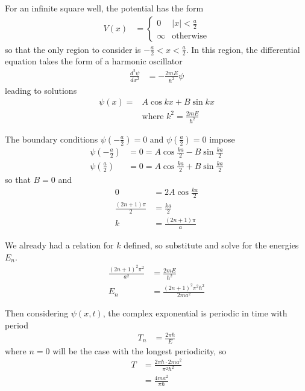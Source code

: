 For an infinite square well, the potential has the form
\begin{align*}
	V(x) &=
		\begin{cases}
			0	&	|x| < \frac{a}{2} \\
			\infty 	&	\text{otherwise}
		\end{cases}
\end{align*}
so that the only region to consider is $-\frac{a}{2} < x < \frac{a}{2}$. In this
region, the differential equation takes the form of a harmonic oscillator
\begin{align*}
	\frac{d^2\psi }{dx^2} &= -\frac{2mE}{{\hbar}^2}\psi 
\end{align*}
leading to solutions
\begin{align*}
	\psi (x) ={}& A\cos kx + B\sin kx \\
	{}& \text{where } k^2 = \frac{2mE}{{\hbar}^2}
\end{align*}

The boundary conditions $\psi (-\frac{a}{2}) = 0$ and $\psi (\frac{a}{2}) = 0$ impose
\begin{align*}
	\psi \left(-\frac{a}{2}\right) &= 0 = A\cos \frac{ka}{2} - B\sin \frac{ka}{2} \\
	\psi \left(\frac{a}{2}\right)  &= 0 = A\cos \frac{ka}{2} + B\sin \frac{ka}{2}
\end{align*}
so that $B = 0$ and
\begin{align*}
	0 &= 2A \cos \frac{ka}{2} \\
	\frac{(2n+1){\pi}}{2} &= \frac{ka}{2} \\
	k &= \frac{(2n+1){\pi}}{a}
\end{align*}

We already had a relation for $k$ defined, so substitute and solve for the
energies $E_n$.
\begin{align*}
	\frac{(2n+1)^2{\pi}^2}{a^2} &= \frac{2mE}{{\hbar}^2} \\
	E_n &= \frac{(2n+1)^2{\pi}^2{\hbar}^2}{2ma^2}
\end{align*}

Then considering $\psi (x,t)$, the complex exponential is periodic in time with
period
\begin{align*}
	T_n &= \frac{2{\pi}{\hbar}}{E}
\end{align*}
where $n = 0$ will be the case with the longest periodicity, so
\begin{align*}
	T &= \frac{2{\pi}{\hbar}\cdot 2ma^2}{{\pi}^2{\hbar}^2} \\
	{} &= \frac{4ma^2}{{\pi}{\hbar}}
\end{align*}

